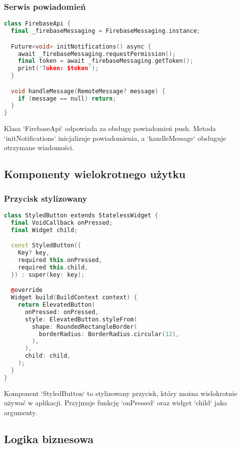 \subsubsection{Serwis powiadomień}
\begin{lstlisting}[language=C++, caption=Serwis powiadomień, label={lst:notification-service}]
class FirebaseApi {
  final _firebaseMessaging = FirebaseMessaging.instance;

  Future<void> initNotifications() async {
    await _firebaseMessaging.requestPermission();
    final token = await _firebaseMessaging.getToken();
    print('Token: $token');
  }

  void handleMessage(RemoteMessage? message) {
    if (message == null) return;
  }
}
\end{lstlisting}
Klasa `FirebaseApi` odpowiada za obsługę powiadomień push. Metoda `initNotifications` inicjalizuje powiadomienia, a `handleMessage` obsługuje otrzymane wiadomości.

\subsection{Komponenty wielokrotnego użytku}

\subsubsection{Przycisk stylizowany}
\begin{lstlisting}[language=C++, caption=Komponent przycisku, label={lst:styled-button}]
class StyledButton extends StatelessWidget {
  final VoidCallback onPressed;
  final Widget child;

  const StyledButton({
    Key? key,
    required this.onPressed,
    required this.child,
  }) : super(key: key);

  @override
  Widget build(BuildContext context) {
    return ElevatedButton(
      onPressed: onPressed,
      style: ElevatedButton.styleFrom(
        shape: RoundedRectangleBorder(
          borderRadius: BorderRadius.circular(12),
        ),
      ),
      child: child,
    );
  }
}
\end{lstlisting}
Komponent `StyledButton` to stylizowany przycisk, który można wielokrotnie używać w aplikacji. Przyjmuje funkcję `onPressed` oraz widget `child` jako argumenty.

\subsection{Logika biznesowa}

